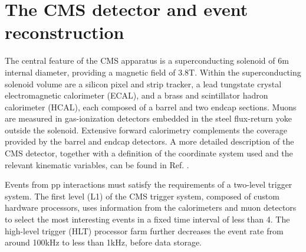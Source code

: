 \section{The CMS detector and event reconstruction}
\label{sect:CMSRec}
The central feature of the CMS apparatus is a superconducting solenoid of 6\unit{m} internal diameter, providing a magnetic field of 3.8\unit{T}. Within the superconducting solenoid volume are a silicon pixel and strip tracker, a lead tungstate crystal electromagnetic calorimeter (ECAL), and a brass and scintillator hadron calorimeter (HCAL), each composed of a barrel and two endcap sections. Muons are measured in gas-ionization detectors embedded in the steel flux-return yoke outside the solenoid. Extensive forward calorimetry complements the coverage provided by the barrel and endcap detectors. 
A more detailed description of the CMS detector, together with a definition of the coordinate system used and the relevant kinematic variables, can be found in Ref. \cite{Chatrchyan:2008zzk}.


Events from pp interactions must satisfy the requirements of a two-level trigger system.
The first level (L1) of the CMS trigger system, composed of custom hardware processors, uses information from the calorimeters and muon detectors to select the most interesting events in a fixed time interval of less than 4\mus. The high-level trigger (HLT) processor farm further decreases the event rate from around 100\unit{kHz} to less than 1\unit{kHz}, before data storage. 

